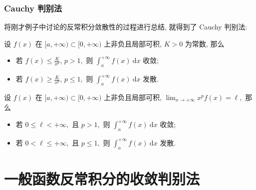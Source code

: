 
\begin{frame}
\frametitle{Cauchy 判别法}

将刚才例子中讨论的反常积分敛散性的过程进行总结, 就得到了 Cauchy 判别法:

\begin{thm}
设 $f(x)$ 在 $[a, +\infty) \subset [0, +\infty)$ 上非负且局部可积, $K > 0$ 为常数, 那么
\begin{itemize}
\item 若 $\displaystyle f(x) \leqslant \frac{K}{x^p}$, $p > 1,$ 则 $\displaystyle \int_a^{+\infty} f(x) ~ \mathrm{d} x$ 收敛;
\item 若 $\displaystyle f(x) \geqslant \frac{K}{x^p}$, $p \leqslant 1,$ 则 $\displaystyle \int_a^{+\infty} f(x) ~ \mathrm{d} x$ 发散.
\end{itemize}
\end{thm}

\pause
\vspace{0.5em}

\begin{cor}
设 $f(x)$ 在 $[a, +\infty) \subset [0, +\infty)$ 上非负且局部可积, $\displaystyle \lim_{x \to +\infty} x^p f(x) = \ell,$ 那么
\begin{itemize}
\item 若 $0 \leqslant \ell < +\infty,$ 且 $p > 1,$ 则 $\displaystyle \int_a^{+\infty} f(x) ~ \mathrm{d} x$ 收敛;
\item 若 $0 < \ell \leqslant +\infty,$ 且 $p \leqslant 1,$ 则 $\displaystyle \int_a^{+\infty} f(x) ~ \mathrm{d} x$ 发散.
\end{itemize}
\end{cor}

\end{frame}


\section{一般函数反常积分的收敛判别法}


